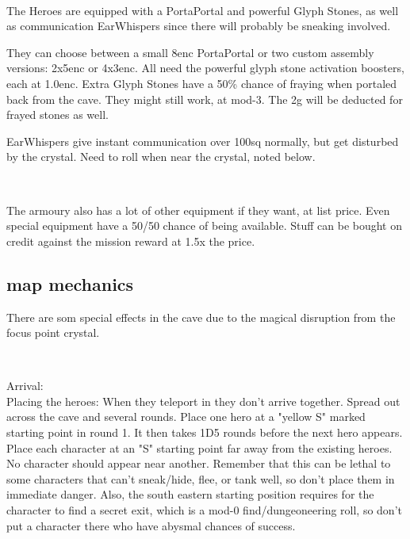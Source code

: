 \

\noindent
The Heroes are equipped with a PortaPortal and powerful Glyph Stones, as well as communication EarWhispers since there will probably be sneaking involved.

They can choose between a small 8enc PortaPortal or two custom assembly versions: 2x5enc or 4x3enc. All need the powerful glyph stone activation boosters, each at 1.0enc. Extra Glyph Stones have a 50\% chance of fraying when portaled back from the cave. They might still work, at mod-3. The 2g will be deducted for frayed stones as well.

EarWhispers give instant communication over 100sq normally, but get disturbed by the crystal. Need to roll when near the crystal, noted below.

\

The armoury also has a lot of other equipment if they want, at list price. Even special equipment have a 50/50 chance of being available. Stuff can be bought on credit against the mission reward at 1.5x the price.





\subsection*{map mechanics}
There are som special effects in the cave due to the magical disruption from the focus point crystal.

\

Arrival:\\
Placing the heroes: When they teleport in they don't arrive together. Spread out across the cave and several rounds. Place one hero at a "yellow S" marked starting point in round 1. It then takes 1D5 rounds before the next hero appears. Place each character at an "S" starting point far away from the existing heroes. No character should appear near another.
Remember that this can be lethal to some characters that can't sneak/hide, flee, or tank well, so don't place them in immediate danger. Also, the south eastern starting position requires for the character to find a secret exit, which is a mod-0 find/dungeoneering roll, so don't put a character there who have abysmal chances of success.

